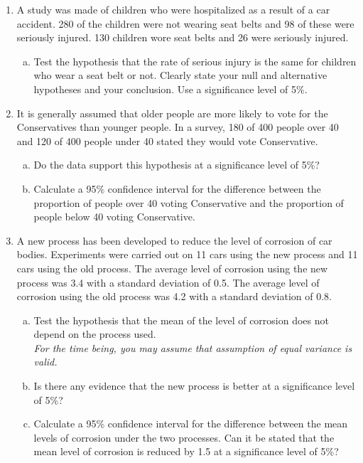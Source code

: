 \documentclass[]{article}
\begin{document}
\begin{enumerate}
 \item  A study was made of children who were hospitalized as a result of a car accident. 280 of the children were not wearing seat belts and 98 of these were seriously injured. 130 children wore seat belts and 26 were seriously injured. 
\begin{enumerate}[(a)]
\item Test the hypothesis that the rate of serious injury is the same for children who wear a seat belt or not. Clearly state your null and alternative hypotheses and your conclusion. Use a significance level of 5\%.
\end{enumerate}
\item It is generally assumed that older people are more likely to vote for the Conservatives than younger people. In a survey, 180 of 400 people over 40 and 120 of 400 people under 40 stated they would vote Conservative. 
\begin{enumerate}[(a)]
\item Do the data support this hypothesis at a significance level of 5\%?
\item Calculate a 95\% confidence interval for the difference between the proportion of people over 40 voting Conservative and the proportion of people below 40 voting Conservative. 
\end{enumerate}

\item
A new process has been developed to reduce the level of corrosion of car bodies. Experiments were carried out on 11 cars using the new process and 11 cars using the old process. The average level of corrosion using the new process was 3.4 with a standard deviation of 0.5. The average level of corrosion using the old process was 4.2 with a standard deviation of 0.8. 
\begin{enumerate}[(a)]
\item Test the hypothesis that the mean of the level of corrosion does not depend on the process used. \\ \textit{For the time being, you may assume that assumption of equal variance is valid. }
\item Is there any evidence that the new process is better at a significance level of 5\%?
\item Calculate a 95\% confidence interval for the difference between the mean levels of corrosion under the two processes. Can it be stated that the mean level of corrosion is reduced by 1.5 at a significance level of 5\%? 
\end{enumerate}


\end{enumerate}
\end{document}
